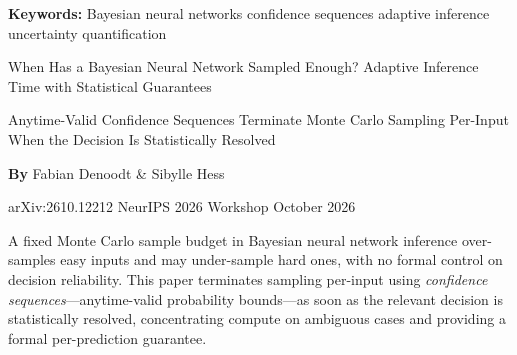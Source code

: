 \documentclass[10pt,twocolumn]{article}
\begin{document}
\setlength{\parindent}{0pt}
\setlength{\parskip}{4pt}

{\small\color{keywordgray}\textbf{Keywords:}
  Bayesian neural networks \textbullet{}
  confidence sequences \textbullet{}
  adaptive inference \textbullet{}
  uncertainty quantification}\par\vspace{4pt}

{\LARGE\bfseries\raggedright
  When Has a Bayesian Neural Network Sampled Enough?
  Adaptive Inference Time with Statistical Guarantees}\par\vspace{4pt}

{\large\itshape\raggedright
  Anytime-Valid Confidence Sequences Terminate Monte Carlo Sampling
  Per-Input When the Decision Is Statistically Resolved}\par\vspace{6pt}

{\small\textbf{By} Fabian Denoodt \& Sibylle Hess}\par\vspace{2pt}

{\small\color{keywordgray}arXiv:2610.12212 \textbullet{} NeurIPS 2026 Workshop \textbullet{} October 2026}
\par\vspace{2pt}\noindent{\color{rulered}\rule{\columnwidth}{0.6pt}}\vspace{6pt}

A fixed Monte Carlo sample budget in Bayesian neural network inference
over-samples easy inputs and may under-sample hard ones, with no formal
control on decision reliability. This paper terminates sampling per-input
using \emph{confidence sequences}---anytime-valid probability bounds---as
soon as the relevant decision is statistically resolved, concentrating
compute on ambiguous cases and providing a formal per-prediction guarantee.
\end{document}
